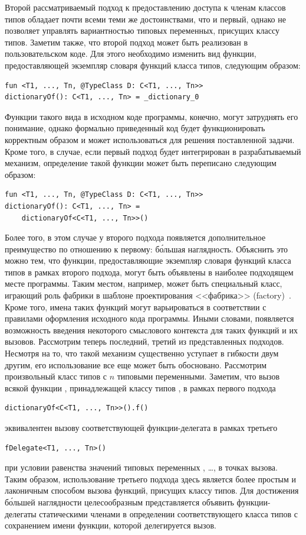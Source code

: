 Второй рассматриваемый подход к предоставлению доступа к членам классов типов обладает почти всеми теми же достоинствами, что и первый, однако не позволяет управлять вариантностью типовых переменных, присущих классу типов. Заметим также, что второй подход может быть реализован в пользовательском коде. Для этого необходимо изменить вид функции, предоставляющей экземпляр словаря функций класса типов, следующим образом:
\begin{lstlisting}[style={wo_caption}]
fun <T1, ..., Tn, @TypeClass D: C<T1, ..., Tn>> 
dictionaryOf(): C<T1, ..., Tn> = _dictionary_0
\end{lstlisting}
Функции такого вида в исходном коде программы, конечно, могут затруднять его понимание, однако формально приведенный код будет функционировать корректным образом и может использоваться для решения поставленной задачи. Кроме того, в случае, если первый подход будет интегрирован в разрабатываемый механизм, определение такой функции может быть переписано следующим образом:
\begin{lstlisting}[style={wo_caption}]
fun <T1, ..., Tn, @TypeClass D: C<T1, ..., Tn>> 
dictionaryOf(): C<T1, ..., Tn> = 
    dictionaryOf<C<T1, ..., Tn>>()
\end{lstlisting}
Более того, в этом случае у второго подхода появляется дополнительное преимущество по отношению к первому: б\'{о}льшая наглядность. Объяснить это можно тем, что функции, предоставляющие экземпляр словаря функций класса типов в рамках второго подхода, могут быть объявлены в наиболее подходящем месте программы. Таким местом, например, может быть специальный класс, играющий роль фабрики в шаблоне проектирования <<фабрика>> (factory)~\cite[стр.~269--275]{Martin03}. Кроме того, имена таких функций могут варьироваться в соответствии с правилами оформления исходного кода программы. Иными словами, появляется возможность введения некоторого смыслового контекста для таких функций и их вызовов. Рассмотрим теперь последний, третий из представленных подходов. Несмотря на то, что такой механизм существенно уступает в гибкости двум другим, его использование все еще может быть обосновано. Рассмотрим произвольный класс типов  с $n$ типовыми переменными. Заметим, что вызов всякой функции , принадлежащей классу типов , в рамках первого подхода
\begin{lstlisting}[style={wo_caption}]
dictionaryOf<C<T1, ..., Tn>>().f()
\end{lstlisting}
эквивалентен вызову соответствующей функции-делегата  в рамках третьего   
\begin{lstlisting}[style={wo_caption}]
fDelegate<T1, ..., Tn>()
\end{lstlisting}
при условии равенства значений типовых переменных , \ldots,  в точках вызова. Таким образом, использование третьего подхода здесь является более простым и лаконичным способом вызова функций, присущих классу типов. Для достижения б\'{о}льшей наглядности целесообразным представляется объявить функции-делегаты статическими членами в определении соответствующего класса типов с сохранением имени функции, которой делегируется вызов. 

